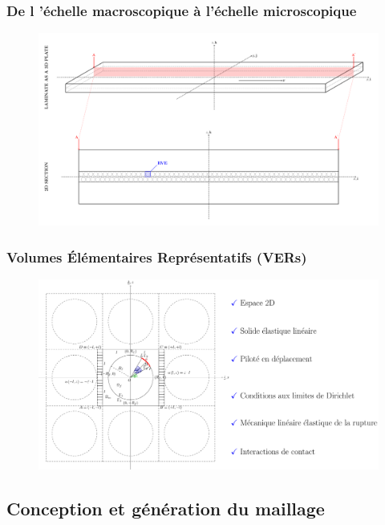 \documentclass[first,firstsupp,lastsupp,handout,last,hyperref,table]{ETHclass}
\begin{document}
\begin{frame}
\frametitle{\small De l '\'echelle macroscopique \`a l'\'echelle microscopique}
\vspace{-1cm}
\centering
\begin{figure}
\centering
\includegraphics[height=0.85\textheight]{laminate-section.pdf}
\label{fig:spread-tow-schematic}
\end{figure}
\end{frame}

\begin{frame}
\frametitle{Volumes \'El\'ementaires Repr\'esentatifs (VERs)}
\vspace{-0.75cm}
\centering
\begin{figure}
\centering
\includegraphics[height=0.8\textheight]{periodicRVE_cc_FR.pdf}
\label{fig:periodicRVE}
\end{figure}
\end{frame}

\subsection[Le maillage]{Conception et g\'en\'eration du maillage}
\end{document}
